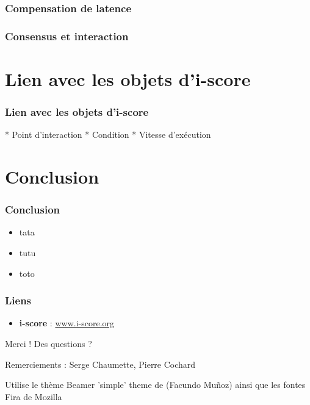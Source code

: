 \documentclass[draft,handout]{beamer}
\begin{document}
\begin{frame}
\frametitle{Compensation de latence}
\end{frame}

\begin{frame}
\frametitle{Consensus et interaction}
\end{frame}

\section{Lien avec les objets d'i-score}
\begin{frame}
\frametitle{Lien avec les objets d'i-score}
* Point d'interaction
* Condition
* Vitesse d'exécution
\end{frame}

\section{Conclusion}
\begin{frame}
    \frametitle{Conclusion}  
    \Large
    \begin{itemize}
        \item<1> tata
        \item<2> tutu
        \item<3> toto
    \end{itemize}
\end{frame}

\begin{frame}[allowframebreaks]%
    
    
    
    {\footnotesize
        \nocite{*}
        
        
    }
\end{frame}

\begin{frame}
    \frametitle{Liens} 
    \Large
    \begin{itemize}
        \setlength\itemsep{1em}
        \item \textbf{i-score} : \url{www.i-score.org}
    \end{itemize}
        
    \centering
    \vspace{2em}
    \Large{Merci ! Des questions ?}
    \vspace{2em}
    
    \small{Remerciements : Serge Chaumette, Pierre Cochard}
    
    \vspace{1em}
    
    \tiny{Utilise le thème Beamer 'simple' theme de (Facundo Muñoz) ainsi que les fontes Fira de Mozilla}
\end{frame}
\end{document}
